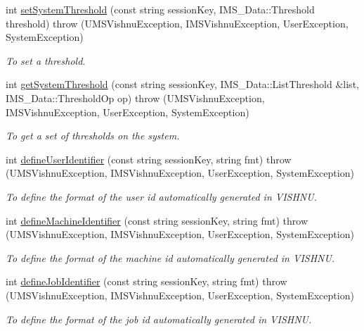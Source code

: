 \begin{DoxyCompactItemize}
int \hyperlink{namespacevishnu_abdf98c34bf2ad136aa4e2cf2d8611cf0}{setSystemThreshold} (const string sessionKey, IMS\_\-Data::Threshold threshold)  throw (UMSVishnuException, IMSVishnuException, UserException, SystemException)
\begin{DoxyCompactList}\small\item\em To set a threshold. \item\end{DoxyCompactList}\item 
int \hyperlink{namespacevishnu_a19659b2087323b8bd44940afae500a98}{getSystemThreshold} (const string sessionKey, IMS\_\-Data::ListThreshold \&list, IMS\_\-Data::ThresholdOp op)  throw (UMSVishnuException, IMSVishnuException, UserException, SystemException)
\begin{DoxyCompactList}\small\item\em To get a set of thresholds on the system. \item\end{DoxyCompactList}\item 
int \hyperlink{namespacevishnu_a6388e9aa2c64ef4dfeee9a253dfc2d55}{defineUserIdentifier} (const string sessionKey, string fmt)  throw (UMSVishnuException, IMSVishnuException, UserException, SystemException)
\begin{DoxyCompactList}\small\item\em To define the format of the user id automatically generated in VISHNU. \item\end{DoxyCompactList}\item 
int \hyperlink{namespacevishnu_ae271c5ecdd758dcc4bee27ba2b9c8a3c}{defineMachineIdentifier} (const string sessionKey, string fmt)  throw (UMSVishnuException, IMSVishnuException, UserException, SystemException)
\begin{DoxyCompactList}\small\item\em To define the format of the machine id automatically generated in VISHNU. \item\end{DoxyCompactList}\item 
int \hyperlink{namespacevishnu_a1b44c77d6bccf4fd886be4028f27bb73}{defineJobIdentifier} (const string sessionKey, string fmt)  throw (UMSVishnuException, IMSVishnuException, UserException, SystemException)
\begin{DoxyCompactList}\small\item\em To define the format of the job id automatically generated in VISHNU. \item\end{DoxyCompactList}\item 

\end{DoxyCompactItemize}
